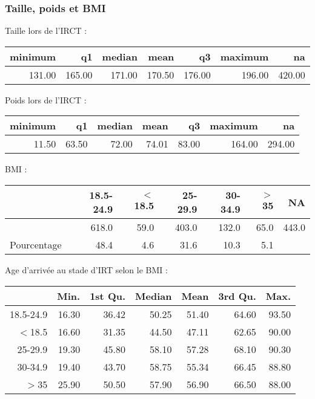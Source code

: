 \documentclass[11pt,a4paper]{article}\usepackage[]{graphicx}\usepackage[]{color}
\begin{document}
    \subsubsection{Taille, poids et BMI}
  
Taille lors de l'IRCT :
  
\begin{table}[ht]
\centering
\begin{tabular}{rrrrrrr}
  \hline
minimum & q1 & median & mean & q3 & maximum & na \\ 
  \hline
131.00 & 165.00 & 171.00 & 170.50 & 176.00 & 196.00 & 420.00 \\ 
   \hline
\end{tabular}
\end{table}


Poids lors de l'IRCT :

\begin{table}[ht]
\centering
\begin{tabular}{rrrrrrr}
  \hline
minimum & q1 & median & mean & q3 & maximum & na \\ 
  \hline
11.50 & 63.50 & 72.00 & 74.01 & 83.00 & 164.00 & 294.00 \\ 
   \hline
\end{tabular}
\end{table}


BMI :

\begin{table}[H]
\centering
\begin{tabular}{rrrrrrr}
  \hline
 & 18.5-24.9 & $<$18.5 & 25-29.9 & 30-34.9 & $>$35 & NA \\ 
  \hline
 & 618.0 & 59.0 & 403.0 & 132.0 & 65.0 & 443.0 \\ 
  Pourcentage & 48.4 & 4.6 & 31.6 & 10.3 & 5.1 &  \\ 
   \hline
\end{tabular}
\end{table}


Age d'arrivée au stade d'IRT selon le BMI :

\begin{table}[H]
\centering
\begin{tabular}{rrrrrrr}
  \hline
 & Min. & 1st Qu. & Median & Mean & 3rd Qu. & Max. \\ 
  \hline
18.5-24.9 & 16.30 & 36.42 & 50.25 & 51.40 & 64.60 & 93.50 \\ 
  $<$18.5 & 16.60 & 31.35 & 44.50 & 47.11 & 62.65 & 90.00 \\ 
  25-29.9 & 19.30 & 45.80 & 58.10 & 57.28 & 68.10 & 90.30 \\ 
  30-34.9 & 19.40 & 43.70 & 58.75 & 55.34 & 66.45 & 88.80 \\ 
  $>$35 & 25.90 & 50.50 & 57.90 & 56.90 & 66.50 & 88.00 \\ 
   \hline
\end{tabular}
\end{table}
\end{document}
